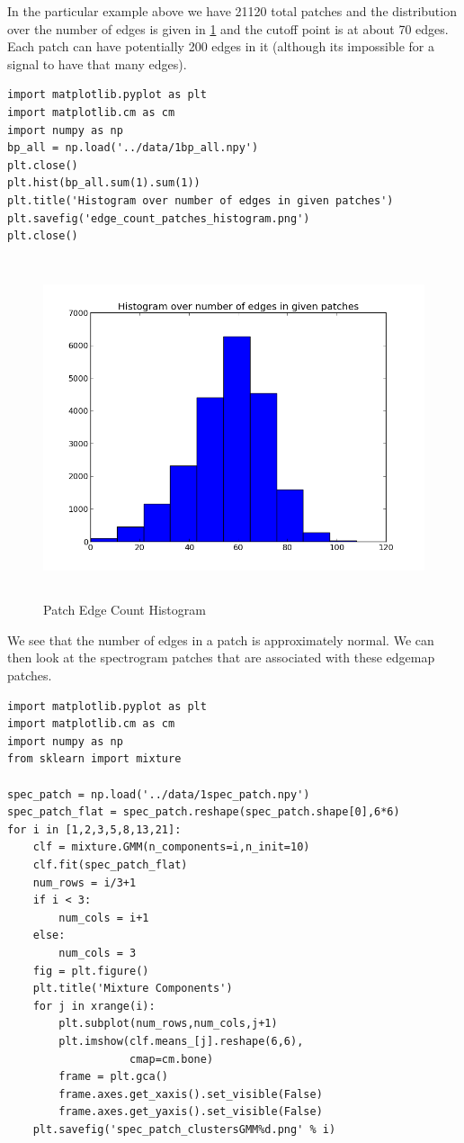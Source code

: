 \documentclass[11pt]{article}
\begin{document}
In the particular example above we have 21120 total patches and the
distribution over the number of edges is given in
\ref{fig:edge_count_histogram} and the cutoff point is at about 70
edges.  Each patch can have potentially 200 edges in it (although its
impossible for a signal to have that many edges).


\begin{verbatim}
import matplotlib.pyplot as plt
import matplotlib.cm as cm
import numpy as np
bp_all = np.load('../data/1bp_all.npy')
plt.close()
plt.hist(bp_all.sum(1).sum(1))
plt.title('Histogram over number of edges in given patches')
plt.savefig('edge_count_patches_histogram.png')
plt.close()
\end{verbatim}




\begin{figure}[htb]
\centering
\includegraphics[height=10cm]{./edge_count_patches_histogram.png}
\caption{\label{fig:edge_count_histogram}Patch Edge Count Histogram}
\end{figure}

We see that the number of edges in a patch is approximately normal.
We can then look at the spectrogram patches that are associated with these
edgemap patches.  


\begin{verbatim}
import matplotlib.pyplot as plt
import matplotlib.cm as cm
import numpy as np
from sklearn import mixture

spec_patch = np.load('../data/1spec_patch.npy')
spec_patch_flat = spec_patch.reshape(spec_patch.shape[0],6*6)
for i in [1,2,3,5,8,13,21]:
    clf = mixture.GMM(n_components=i,n_init=10)
    clf.fit(spec_patch_flat)
    num_rows = i/3+1
    if i < 3:
        num_cols = i+1
    else:
        num_cols = 3
    fig = plt.figure()
    plt.title('Mixture Components')
    for j in xrange(i):
        plt.subplot(num_rows,num_cols,j+1)
        plt.imshow(clf.means_[j].reshape(6,6),
                   cmap=cm.bone)
        frame = plt.gca()
        frame.axes.get_xaxis().set_visible(False)
        frame.axes.get_yaxis().set_visible(False)
    plt.savefig('spec_patch_clustersGMM%d.png' % i)
\end{verbatim}
\end{document}
